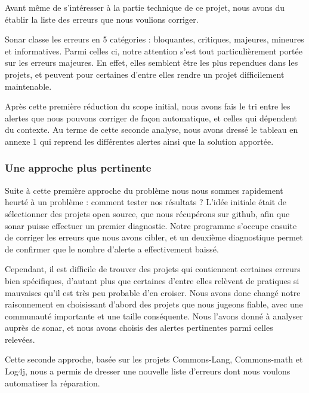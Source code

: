 \documentclass[a4paper]{article}
\begin{document}
\par Avant même de s'intéresser à la partie technique de ce projet, nous avons du établir la liste des erreurs que nous voulions corriger.
\\
\par Sonar classe les erreurs en 5 catégories : bloquantes, critiques, majeures, mineures et informatives. Parmi celles ci, notre attention s'est tout particulièrement portée sur les erreurs majeures. En effet, elles semblent être les plus rependues dans les projets, et peuvent pour certaines d'entre elles rendre un projet difficilement maintenable.
\\
\par Après cette première réduction du scope initial, nous avons fais le tri entre les alertes que nous pouvons corriger de façon automatique, et celles qui dépendent du contexte. Au terme de cette seconde analyse, nous avons dressé le tableau en annexe 1 qui reprend les différentes alertes ainsi que la solution apportée.

\subsubsection{Une approche plus pertinente}
\par Suite à cette première approche du problème nous nous sommes rapidement heurté à un problème : comment tester nos résultats ? L'idée initiale était de sélectionner des projets open source, que nous récupérons sur github, afin que sonar puisse effectuer un premier diagnostic. Notre programme s'occupe ensuite de corriger les erreurs que nous avons cibler, et un deuxième diagnostique permet de confirmer que le nombre d'alerte a effectivement baissé. 
\\
\par Cependant, il est difficile de trouver des projets qui contiennent certaines erreurs bien spécifiques, d'autant plus que certaines d'entre elles relèvent de pratiques si mauvaises qu'il est très peu probable d'en croiser. Nous avons donc changé notre raisonnement en choisissant d'abord des projets que nous jugeons fiable, avec une communauté importante et une taille conséquente. Nous l'avons donné à analyser auprès de sonar, et nous avons choisis des alertes pertinentes parmi celles relevées.
\\
\par Cette seconde approche, basée sur les projets Commons-Lang, Commons-math et Log4j, nous a permis de dresser une nouvelle liste d'erreurs dont nous voulons automatiser la réparation.
\end{document}
